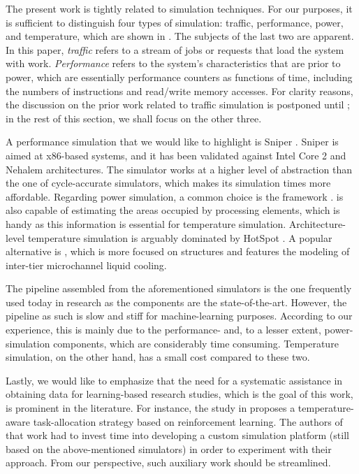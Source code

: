 The present work is tightly related to simulation techniques. For our purposes,
it is sufficient to distinguish four types of simulation: traffic, performance,
power, and temperature, which are shown in . The subjects of the
last two are apparent. In this paper, \emph{traffic} refers to a stream of jobs
or requests that load the system with work. \emph{Performance} refers to the
system's characteristics that are prior to power, which are essentially
performance counters as functions of time, including the numbers of instructions
and read/write memory accesses. For clarity reasons, the discussion on the prior
work related to traffic simulation is postponed until ; in the
rest of this section, we shall focus on the other three.

A performance simulation that we would like to highlight is Sniper
\cite{carlson2011}. Sniper is aimed at x86-based systems, and it has been
validated against Intel Core 2 and Nehalem architectures. The simulator works at
a higher level of abstraction than the one of cycle-accurate simulators, which
makes its simulation times more affordable. Regarding power simulation, a common
choice is the  framework \cite{li2009}.  is also capable of
estimating the areas occupied by processing elements, which is handy as this
information is essential for temperature simulation. Architecture-level
temperature simulation is arguably dominated by HotSpot \cite{skadron2004}. A
popular alternative is  \cite{sridhar2010}, which is more focused on
 structures and features the modeling of inter-tier microchannel liquid
cooling.

The pipeline assembled from the aforementioned simulators is the one frequently
used today in research as the components are the state-of-the-art. However, the
pipeline as such is slow and stiff for machine-learning purposes. According to
our experience, this is mainly due to the performance- and, to a lesser extent,
power-simulation components, which are considerably time consuming. Temperature
simulation, on the other hand, has a small cost compared to these two.

Lastly, we would like to emphasize that the need for a systematic assistance in
obtaining data for learning-based research studies, which is the goal of this
work, is prominent in the literature. For instance, the study in \cite{lu2015}
proposes a temperature-aware task-allocation strategy based on reinforcement
learning. The authors of that work had to invest time into developing a custom
simulation platform (still based on the above-mentioned simulators) in order to
experiment with their approach. From our perspective, such auxiliary work should
be streamlined.
